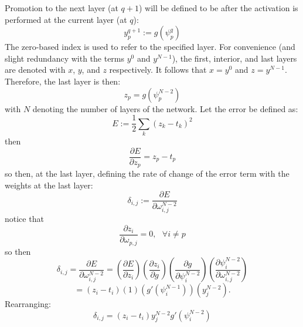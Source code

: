 \documentclass{article}
\begin{document}
Promotion to the next layer (at $q+1$) will be defined to be after the activation is performed at the current layer (at $q$):
%
\begin{equation} \label{eq:z}
y_p^{q+1} := g(\psi_p^q)
\end{equation}
%
The zero-based index is used to refer to the specified layer.
For convenience (and slight redundancy with the terms $y^0$ and $y^{N-1}$), the first, interior, and last layers are denoted with $x$, $y$, and $z$ respectively.
It follows that $x = y^0$ and $z = y^{N-1}$.
Therefore, the last layer is then:
%
\begin{equation} \label{eq:z}
z_p = g(\psi_p^{N-2})
\end{equation}
%
with $N$ denoting the number of layers of the network.
%
Let the error be defined as:
%
\begin{equation} \label{eq:error}
E := \frac{1}{2} \sum_k (z_k - t_k)^2
\end{equation}
%
then
%
\begin{equation} \label{eq:derror}
\frac{\partial E}{\partial z_p} = z_p - t_p
\end{equation}
%
so then, at the last layer, defining the rate of change of the error term with the weights at the last layer:
%
\begin{equation} \label{eq:delta}
\delta_{i,j} := \frac{\partial E}{\partial \omega_{i,j}^{N-2}}
\end{equation}
%
notice that
%
\begin{equation} \label{eq:last_layer_derror_eq_0}
\frac{\partial z_i}{\partial \omega_{p,j}} = 0, \ \ \ \forall i \neq p
\end{equation}
%
so then
%
\begin{equation} \label{eq:last_layer_derror}
\delta_{i,j} =
\frac{\partial E}{\partial \omega_{i,j}^{N-2}} =
\left( \frac{\partial E}{\partial z_i} \right)
\left( \frac{\partial z_i}{\partial g} \right)
\left( \frac{\partial g}{\partial \psi_i^{N-2}} \right)
\left( \frac{\partial \psi_i^{N-2}}{\partial \omega_{i, j}^{N-2}} \right )
\end{equation}
%
\begin{equation} \label{eq:last_layer_derror3}
=
\left( z_i - t_i \right)
\left( 1 \right)
\left( g' (\psi_i^{N-1}) \right)
\left( y_j^{N-2} \right).
\end{equation}
%
Rearranging:
\begin{equation} \label{eq:delta_full}
\delta_{i,j} = 
\left ( z_i - t_i \right ) y_j^{N-2} g' (\psi_i^{N-2})
\end{equation}
\end{document}
